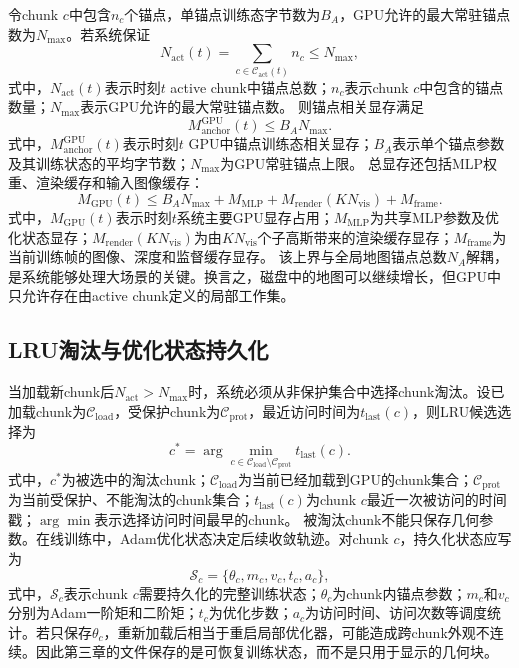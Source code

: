 令chunk $c$中包含$n_c$个锚点，单锚点训练态字节数为$B_A$，GPU允许的最大常驻锚点数为$N_{\max}$。若系统保证
\begin{equation}
N_{\mathrm{act}}(t)=
\sum_{c\in\mathcal{C}_{\mathrm{act}}(t)}n_c
\leq N_{\max},
\end{equation}
式中，$N_{\mathrm{act}}(t)$表示时刻$t$ active chunk中锚点总数；$n_c$表示chunk $c$中包含的锚点数量；$N_{\max}$表示GPU允许的最大常驻锚点数。
则锚点相关显存满足
\begin{equation}
M_{\mathrm{anchor}}^{\mathrm{GPU}}(t)
\leq
B_A N_{\max}.
\end{equation}
式中，$M_{\mathrm{anchor}}^{\mathrm{GPU}}(t)$表示时刻$t$ GPU中锚点训练态相关显存；$B_A$表示单个锚点参数及其训练状态的平均字节数；$N_{\max}$为GPU常驻锚点上限。
总显存还包括MLP权重、渲染缓存和输入图像缓存：
\begin{equation}
M_{\mathrm{GPU}}(t)
\leq
B_A N_{\max}
+
M_{\mathrm{MLP}}
+
M_{\mathrm{render}}(KN_{\mathrm{vis}})
+
M_{\mathrm{frame}}.
\end{equation}
式中，$M_{\mathrm{GPU}}(t)$表示时刻$t$系统主要GPU显存占用；$M_{\mathrm{MLP}}$为共享MLP参数及优化状态显存；$M_{\mathrm{render}}(KN_{\mathrm{vis}})$为由$K N_{\mathrm{vis}}$个子高斯带来的渲染缓存显存；$M_{\mathrm{frame}}$为当前训练帧的图像、深度和监督缓存显存。
该上界与全局地图锚点总数$N_A$解耦，是系统能够处理大场景的关键。换言之，磁盘中的地图可以继续增长，但GPU中只允许存在由active chunk定义的局部工作集。

\subsection{LRU淘汰与优化状态持久化}

当加载新chunk后$N_{\mathrm{act}}>N_{\max}$时，系统必须从非保护集合中选择chunk淘汰。设已加载chunk为$\mathcal{C}_{\mathrm{load}}$，受保护chunk为$\mathcal{C}_{\mathrm{prot}}$，最近访问时间为$t_{\mathrm{last}}(c)$，则LRU候选选择为
\begin{equation}
c^\ast=
\arg\min_{c\in
\mathcal{C}_{\mathrm{load}}\setminus\mathcal{C}_{\mathrm{prot}}}
t_{\mathrm{last}}(c).
\end{equation}
式中，$c^\ast$为被选中的淘汰chunk；$\mathcal{C}_{\mathrm{load}}$为当前已经加载到GPU的chunk集合；$\mathcal{C}_{\mathrm{prot}}$为当前受保护、不能淘汰的chunk集合；$t_{\mathrm{last}}(c)$为chunk $c$最近一次被访问的时间戳；$\arg\min$表示选择访问时间最早的chunk。
被淘汰chunk不能只保存几何参数。在线训练中，Adam优化状态决定后续收敛轨迹。对chunk $c$，持久化状态应写为
\begin{equation}
\mathcal{S}_c=
\{\theta_c,m_c,v_c,t_c,a_c\},
\end{equation}
式中，$\mathcal{S}_c$表示chunk $c$需要持久化的完整训练状态；$\theta_c$为chunk内锚点参数；$m_c$和$v_c$分别为Adam一阶矩和二阶矩；$t_c$为优化步数；$a_c$为访问时间、访问次数等调度统计。若只保存$\theta_c$，重新加载后相当于重启局部优化器，可能造成跨chunk外观不连续。因此第三章的\schun 文件保存的是可恢复训练状态，而不是只用于显示的几何块。

